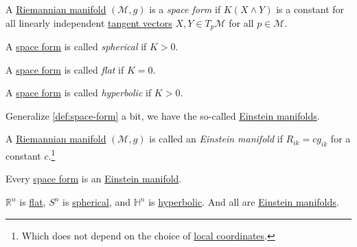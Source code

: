 \begin{definition}\label{def:space-form}
	A \hyperref[def:Riemannian-manifold]{Riemannian manifold} \((\mathcal{M} , g)\) is a \emph{space form} if \(K(X\wedge Y) \) is a constant for all linearly independent \hyperref[def:tangent-vector]{tangent vectors} \(X, Y\in T_p \mathcal{M} \) for all \(p\in \mathcal{M} \).

	\begin{definition}[Spherical]\label{def:space-form-spherical}
		A \hyperref[def:space-form]{space form} is called \emph{spherical} if \(K > 0\).
	\end{definition}

	\begin{definition}[Flat]\label{def:space-form-flat}
		A \hyperref[def:space-form]{space form} is called \emph{flat} if \(K = 0\).
	\end{definition}

	\begin{definition}[Hyperbolic]\label{def:space-form-hyperbolic}
		A \hyperref[def:space-form]{space form} is called \emph{hyperbolic} if \(K > 0\).
	\end{definition}
\end{definition}

Generalize \autoref{def:space-form} a bit, we have the so-called \hyperref[def:Einstein-manifold]{Einstein manifolds}.

\begin{definition}\label{def:Einstein-manifold}
	A \hyperref[def:Riemannian-manifold]{Riemannian manifold} \((\mathcal{M} , g)\) is called an \emph{Einstein manifold} if \(R_{ik} = c g_{ik} \) for a constant \(c\).\footnote{Which does not depend on the choice of \hyperref[def:coordinate-chart]{local coordinates}.}
\end{definition}

\begin{remark}
	Every \hyperref[def:space-form]{space form} is an \hyperref[def:Einstein-manifold]{Einstein manifold}.
\end{remark}

\begin{eg}
	\(\mathbb{R} ^n\) is \hyperref[def:space-form-flat]{flat}, \(S^n\) is \hyperref[def:space-form-spherical]{spherical}, and \(\mathbb{H} ^n\) is \hyperref[def:space-form-hyperbolic]{hyperbolic}. And all are \hyperref[def:Einstein-manifold]{Einstein manifolds}.
	\begin{center}
	\end{center}
\end{eg}

